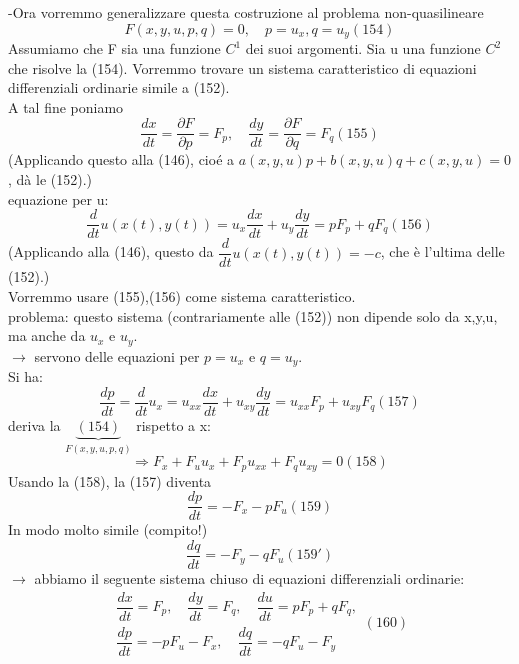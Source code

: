 \documentclass[a4paper,11pt]{report}
\begin{document}
-Ora vorremmo generalizzare questa costruzione al problema non-quasilineare
\begin{equation}
F(x,y,u,p,q)=0, \quad p=u_x, q=u_y (154)
\end{equation}
Assumiamo che F sia una funzione $C^1$ dei suoi argomenti. Sia u una funzione $C^2$ che risolve la (154). Vorremmo trovare un sistema caratteristico di equazioni differenziali ordinarie simile a (152).\\
A tal fine poniamo
\begin{equation}
\dfrac{dx}{dt}=\dfrac{\partial F}{\partial p}=F_p, \quad \dfrac{dy}{dt}=\dfrac{\partial F}{\partial q}=F_q (155)
\end{equation}
(Applicando questo alla (146), cioé a $a(x,y,u)p + b(x,y,u)q + c(x,y,u)=0$, dà le (152).)\\
equazione per u:
\begin{equation}
\dfrac{d}{dt}u(x(t),y(t)) = u_x \dfrac{dx}{dt}+u_y\dfrac{dy}{dt}=p F_p + q F_q (156)
\end{equation}
(Applicando alla (146), questo da $\dfrac{d}{dt}u(x(t),y(t))=-c$, che è l'ultima delle (152).)\\
Vorremmo usare (155),(156) come sistema caratteristico.\\
problema: questo sistema (contrariamente alle (152)) non dipende solo da x,y,u, ma anche da $u_x$ e $u_y$. \\
$\rightarrow$ servono delle equazioni per $p=u_x$ e $q=u_y$.\\
Si ha:
\begin{equation}
\dfrac{dp}{dt}=\dfrac{d}{dt}u_x = u_{xx}\dfrac{dx}{dt} + u_{xy}\dfrac{dy}{dt}=u_{xx}F_p + u_{xy}F_q (157)
\end{equation}
deriva la $\underset{F(x,y,u,p,q)}{\underbrace{(154)}}$ rispetto a x:
\begin{equation}
\Rightarrow F_x + F_u u_x + F_p u_{xx} + F_q u_{xy}=0 (158)
\end{equation}
Usando la (158), la (157) diventa
\begin{equation}
\dfrac{dp}{dt}=-F_x - p F_u (159)
\end{equation}
In modo molto simile (compito!)
\begin{equation}
\dfrac{dq}{dt}=-F_y - qF_u (159')
\end{equation}
$\rightarrow$ abbiamo il seguente sistema chiuso di equazioni differenziali ordinarie:
\begin{equation}
\begin{matrix}
\dfrac{dx}{dt}= F_p,\quad \dfrac{dy}{dt}=F_q, \quad \dfrac{du}{dt}=pF_p + qF_q,\\
\dfrac{dp}{dt}= - p F_u - F_x, \quad \dfrac{dq}{dt}=-q F_u - F_y 
\end{matrix}(160)
\end{equation}
\end{document}
